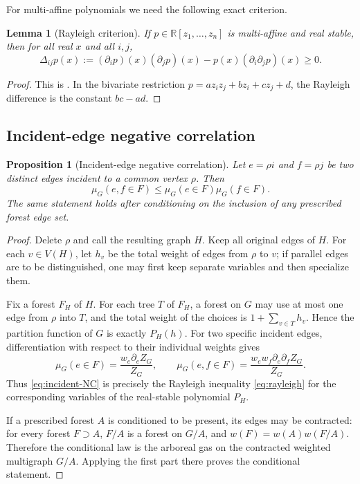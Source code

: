 \documentclass[11pt]{article}
\newtheorem{proposition}[theorem]{Proposition}
\newtheorem{lemma}[theorem]{Lemma}
\theoremstyle{definition}
\theoremstyle{remark}
\newcommand{\1}{\mathbf 1}
\begin{document}
For multi-affine polynomials we need the following exact criterion.

\begin{lemma}[Rayleigh criterion]\label{lem:rayleigh}
If $p\in\mathbb R[z_1,\dots,z_n]$ is multi-affine and real stable, then for all real
$x$ and all $i,j$,
\begin{equation}\label{eq:rayleigh}
 \Delta_{ij}p(x):=(\partial_i p)(x)(\partial_j p)(x)
 -p(x)(\partial_i\partial_jp)(x)\ge0.
\end{equation}
\end{lemma}

\begin{proof}
This is
\cite[Theorem~4.1]{BBL}.  In the bivariate restriction
$p=a z_i z_j+b z_i+c z_j+d$, the Rayleigh difference is the constant $bc-ad$.
\end{proof}

\subsection{Incident-edge negative correlation}

\begin{proposition}[Incident-edge negative correlation]\label{prop:incident-NC}
Let $e=\rho i$ and $f=\rho j$ be two distinct edges incident to a common vertex
$\rho$.  Then
\begin{equation}\label{eq:incident-NC}
 \mu_G(e,f\in F)\le \mu_G(e\in F)\mu_G(f\in F).
\end{equation}
The same statement holds after conditioning on the inclusion of any prescribed
forest edge set.
\end{proposition}

\begin{proof}
Delete $\rho$ and call the resulting graph $H$.  Keep all original edges of $H$.
For each $v\in V(H)$, let $h_v$ be the total weight of edges from $\rho$ to $v$;
if parallel edges are to be distinguished, one may first keep separate variables and
then specialize them.

Fix a forest $F_H$ of $H$.  For each tree $T$ of $F_H$, a forest on $G$ may use at
most one edge from $\rho$ into $T$, and the total weight of the choices is
$1+\sum_{v\in T}h_v$.  Hence the partition function of $G$ is exactly $P_H(h)$.
For two specific incident edges, differentiation with respect to their individual
weights gives
\begin{equation}
 \mu_G(e\in F)=\frac{w_e\partial_e Z_G}{Z_G},\qquad
 \mu_G(e,f\in F)=\frac{w_ew_f\partial_e\partial_f Z_G}{Z_G}.
\end{equation}
Thus \eqref{eq:incident-NC} is precisely the Rayleigh inequality
\eqref{eq:rayleigh} for the corresponding variables of the real-stable polynomial
$P_H$.

If a prescribed forest $A$ is conditioned to be present, its edges may be contracted:
for every forest $F\supset A$, $F/A$ is a forest on $G/A$, and
$w(F)=w(A)w(F/A)$.  Therefore the conditional law is the arboreal gas on the
contracted weighted multigraph $G/A$.  Applying the first part there proves the
conditional statement.
\end{proof}
\end{document}
